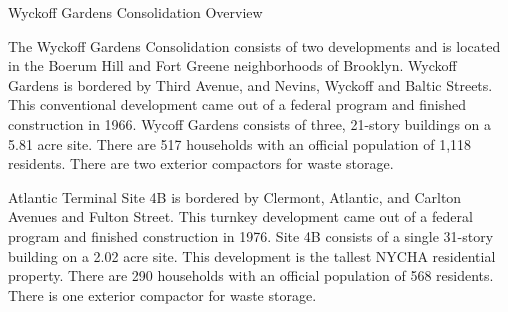 Wyckoff Gardens Consolidation Overview

The Wyckoff Gardens Consolidation consists of two developments and is located in the Boerum Hill and Fort Greene neighborhoods of Brooklyn. Wyckoff Gardens is bordered by Third Avenue, and Nevins, Wyckoff and Baltic Streets. This conventional development came out of a federal program and finished construction in 1966. Wycoff Gardens consists of three, 21-story buildings on a 5.81 acre site. There are 517 households with an official population of 1,118 residents. There are two exterior compactors for waste storage.

Atlantic Terminal Site 4B is bordered by Clermont, Atlantic, and Carlton Avenues and Fulton Street. This turnkey development came out of a federal program and finished construction in 1976. Site 4B consists of a single 31-story building on a 2.02 acre site. This development is the tallest NYCHA residential property. There are 290 households with an official population of 568 residents. There is one exterior compactor for waste storage.